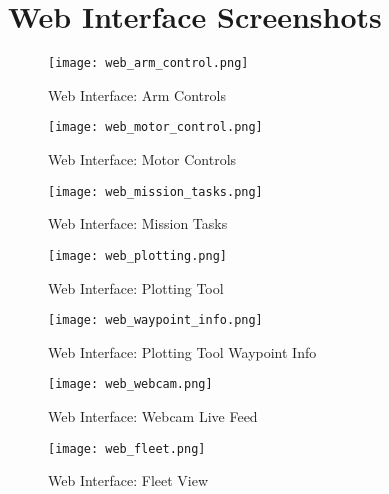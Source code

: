\chapter{Web Interface Screenshots}
\label{app:web_screenshots}
\pagestyle{cameron}

\begin{figure}[!htb]
\begin{center}
\texttt{[image: web\_arm\_control.png]}
\end{center}
\caption{Web Interface: Arm Controls}
\label{fig:web_arm_control}
\end{figure}

\begin{figure}[!htb]
\begin{center}
\texttt{[image: web\_motor\_control.png]}
\end{center}
\caption{Web Interface: Motor Controls}
\label{fig:web_motor_control}
\end{figure}


\begin{figure}[!htb]
\begin{center}
\texttt{[image: web\_mission\_tasks.png]}
\end{center}
\caption{Web Interface: Mission Tasks}
\label{fig:web_mission_tasks}
\end{figure}

\begin{figure}[!htb]
\begin{center}
\texttt{[image: web\_plotting.png]}
\end{center}
\caption{Web Interface: Plotting Tool}
\label{fig:web_plotting}
\end{figure}

\begin{figure}[!htb]
\begin{center}
\texttt{[image: web\_waypoint\_info.png]}
\end{center}
\caption{Web Interface: Plotting Tool Waypoint Info}
\label{fig:web_waypoint_info}
\end{figure}

\begin{figure}[!htb]
\begin{center}
\texttt{[image: web\_webcam.png]}
\end{center}
\caption{Web Interface: Webcam Live Feed}
\label{fig:web_webcam}
\end{figure}

\begin{figure}[!htb]
\begin{center}
\texttt{[image: web\_fleet.png]}
\end{center}
\caption{Web Interface: Fleet View}
\label{fig:web_fleet}
\end{figure}